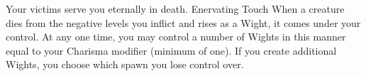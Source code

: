 \shortdescfeat
{Your victims serve you eternally in death.}
{Enervating Touch}
{When a creature dies from the negative levels you inflict and rises as a Wight, it comes under your control. At any one time, you may control a number of Wights in this manner equal to your Charisma modifier (minimum of one). If you create additional Wights, you choose which spawn you lose control over.}

